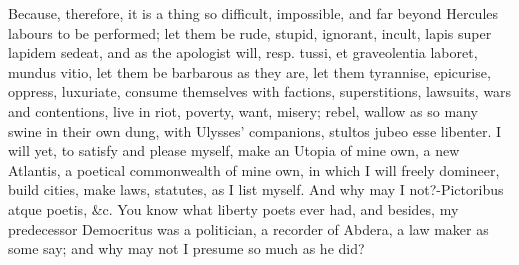 {Because, therefore, it is a thing so difficult, impossible, and far
beyond Hercules labours to be performed; let them be rude, stupid,
ignorant, incult, lapis super lapidem sedeat, and as the apologist
will, resp. tussi, et graveolentia laboret, mundus vitio, let them be
barbarous as they are, let them tyrannise, epicurise, oppress,
luxuriate, consume themselves with factions, superstitions, lawsuits,
wars and contentions, live in riot, poverty, want, misery; rebel,
wallow as so many swine in their own dung, with Ulysses' companions,
stultos jubeo esse libenter. I will yet, to satisfy and please myself,
make an Utopia of mine own, a new Atlantis, a poetical commonwealth of
mine own, in which I will freely domineer, build cities, make laws,
statutes, as I list myself. And why may I not?-Pictoribus atque
poetis, \&c. You know what liberty poets ever had, and besides, my
predecessor Democritus was a politician, a recorder of Abdera, a law
maker as some say; and why may not I presume so much as he did?

}
